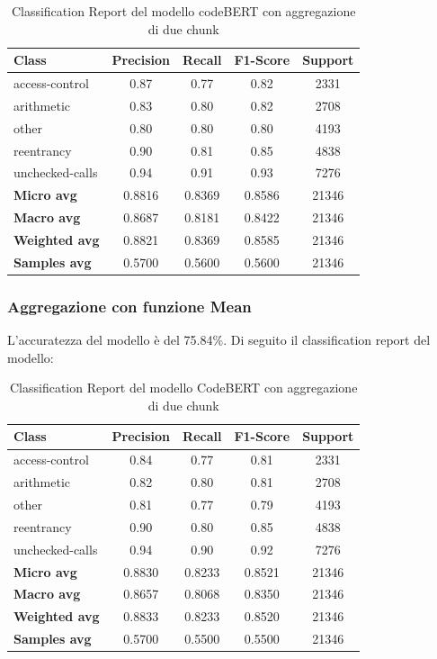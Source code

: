 \documentclass[../../Thesis.tex]{subfiles}
\begin{document}
\begin{table}[H]
    \centering
    \small
    \begin{tabular}{lcccc}
    \hline
    \textbf{Class} & \textbf{Precision} & \textbf{Recall} & \textbf{F1-Score} & \textbf{Support} \\
    \hline
    access-control & 0.87 & 0.77 & 0.82 & 2331 \\
    arithmetic & 0.83 & 0.80 & 0.82 & 2708 \\
    other & 0.80 & 0.80 & 0.80 & 4193 \\
    reentrancy & 0.90 & 0.81 & 0.85 & 4838 \\
    unchecked-calls & 0.94 & 0.91 & 0.93 & 7276 \\
    \hline
    \textbf{Micro avg} & 0.8816 & 0.8369 & 0.8586 & 21346 \\
    \textbf{Macro avg} & 0.8687 & 0.8181 & 0.8422 & 21346 \\
    \textbf{Weighted avg} & 0.8821 & 0.8369 & 0.8585 & 21346 \\
    \textbf{Samples avg} & 0.5700 & 0.5600 & 0.5600 & 21346 \\
    \hline
    \end{tabular}
    \caption{Classification Report del modello codeBERT con aggregazione di due chunk}
    \end{table}

\subsubsection{Aggregazione con funzione Mean}
L'accuratezza del modello è del 75.84\%. Di seguito il classification report del modello:
\begin{table}[H]
    \centering
    \small
    \begin{tabular}{lcccc}
    \hline
    \textbf{Class} & \textbf{Precision} & \textbf{Recall} & \textbf{F1-Score} & \textbf{Support} \\
    \hline
    access-control & 0.84 & 0.77 & 0.81 & 2331 \\
    arithmetic & 0.82 & 0.80 & 0.81 & 2708 \\
    other & 0.81 & 0.77 & 0.79 & 4193 \\
    reentrancy & 0.90 & 0.80 & 0.85 & 4838 \\
    unchecked-calls & 0.94 & 0.90 & 0.92 & 7276 \\
    \hline
    \textbf{Micro avg} & 0.8830 & 0.8233 & 0.8521 & 21346 \\
    \textbf{Macro avg} & 0.8657 & 0.8068 & 0.8350 & 21346 \\
    \textbf{Weighted avg} & 0.8833 & 0.8233 & 0.8520 & 21346 \\
    \textbf{Samples avg} & 0.5700 & 0.5500 & 0.5500 & 21346 \\
    \hline
    \end{tabular}
    \caption{Classification Report del modello CodeBERT con aggregazione di due chunk}
    \end{table}
\end{document}
